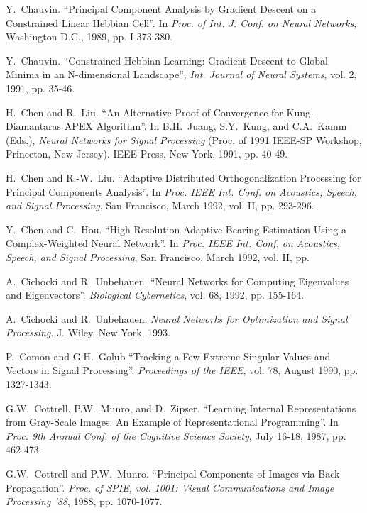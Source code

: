 \begin{thebibliography}{999}
Y.~Chauvin.
``Principal Component Analysis by Gradient Descent on
a Constrained Linear Hebbian Cell''.
In {\em Proc. of Int. J. Conf. on Neural Networks}, Washington D.C.,
1989, pp. I-373-380.

Y.~Chauvin.
``Constrained Hebbian Learning: Gradient Descent to Global
Minima in an N-dimensional Landscape'',
{\em Int. Journal of Neural Systems}, vol. 2, 1991, pp. 35-46.

H.~Chen and R.~Liu.
``An Alternative Proof of Convergence for Kung-Diamantaras APEX
Algorithm''.
In B.H.~Juang, S.Y.~Kung, and C.A.~Kamm (Eds.),
{\em Neural Networks for Signal Processing} (Proc. of 1991 IEEE-SP
Workshop, Princeton, New Jersey). IEEE Press, New York, 1991, pp. 40-49.

H.~Chen and R.-W.~Liu.
``Adaptive Distributed Orthogonalization Processing for Principal Components
Analysis''.
In {\em Proc. IEEE Int. Conf. on Acoustics, Speech, and Signal Processing},
San Francisco, March 1992, vol. II, pp. 293-296.

Y.~Chen and C.~Hou.
``High Resolution Adaptive Bearing Estimation Using a Complex-Weighted
Neural Network''.
In {\em Proc. IEEE Int. Conf. on Acoustics, Speech, and Signal Processing},
San Francisco, March 1992, vol. II, pp. 
 
A.~Cichocki and  R.~Unbehauen.
``Neural Networks for Computing Eigenvalues and Eigenvectors''.
{\em Biological Cybernetics}, vol. 68, 1992, pp. 155-164.

A.~Cichocki and R.~Unbehauen.
{\em Neural Networks for Optimization and Signal Processing}. 
J. Wiley, New York, 1993.

P.~Comon and G.H.~Golub
``Tracking a Few Extreme Singular Values and Vectors in Signal Processing''.
{\em Proceedings of the IEEE}, vol. 78, August 1990, pp. 1327-1343.

G.W.~Cottrell, P.W.~Munro, and D.~Zipser.
``Learning Internal Representations from Gray-Scale Images: 
An Example of Representational Programming''.
In {\em  Proc. 9th Annual Conf. of the Cognitive Science Society}, 
July 16-18, 1987, pp. 462-473.

G.W.~Cottrell and P.W.~Munro. 
``Principal Components of Images via Back Propagation''.
{\em Proc. of SPIE, vol. 1001: Visual Communications and Image
Processing '88}, 1988, pp. 1070-1077.


\end{thebibliography}
